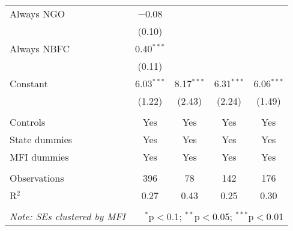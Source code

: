 \documentclass[11pt]{article}
\begin{document}
\begin{table}[!htbp]
\begin{tabular}{lcccc}
  Always NGO & $-$0.08 &  &  &  \\ 
  & (0.10) &  &  &  \\ 
  Always NBFC & 0.40$^{***}$ &  &  &  \\ 
  & (0.11) &  &  &  \\ 
  Constant & 6.03$^{***}$ & 8.17$^{***}$ & 6.31$^{***}$ & 6.06$^{***}$ \\ 
  & (1.22) & (2.43) & (2.24) & (1.49) \\ 
 \hline \\[-1.8ex] 
Controls & Yes & Yes & Yes & Yes \\ 
State dummies & Yes & Yes & Yes & Yes \\ 
MFI dummies & Yes & Yes & Yes & Yes \\ 
\hline \\[-1.8ex] 
Observations & 396 & 78 & 142 & 176 \\ 
R$^{2}$ & 0.27 & 0.43 & 0.25 & 0.30 \\ 
\hline 
\hline \\[-1.8ex] 
\textit{Note: SEs clustered by MFI}  & \multicolumn{4}{r}{$^{*}$p$<$0.1; $^{**}$p$<$0.05; $^{***}$p$<$0.01} \\ 
\end{tabular} 
\end{table} 
\end{document}
